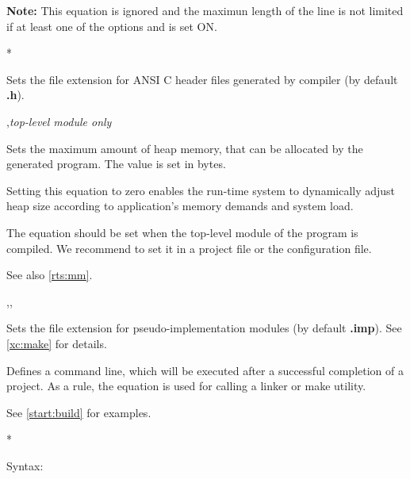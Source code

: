\begin{description}
        {\bf Note:} This equation is ignored and the maximun length of 
        the line is not limited if at least one of the options 
         and  is set ON.
\fi

\ifgenc
{}
        \MLBegin{}*\MLEnd{}

        Sets the file extension for ANSI C header
        files generated by compiler (by default {\bf .h}).
\fi

        \MLBegin{}\ModeC{},{\em top-level module only}\MLEnd{}

        Sets the maximum amount of heap memory, that can be allocated
        by the generated program. The value is set in bytes.

        Setting this equation to zero enables the run-time system
        to dynamically adjust heap size according to application's
        memory demands and system load.

        The equation should be set when the top-level module of the
        program is compiled. We recommend to set it in a
        project file or the configuration file.

        See also \ref{rts:mm}.

\ifcomment
{}
        \MLBegin{}\ModeM{},\ModeP{},\ModeG{}\MLEnd{}

        Sets the file extension for pseudo-implementation
        modules (by default {\bf .imp}).
        See \ref{xc:make} for details.
\fi

%
%


        \MLBegin{}\ModeP{}\MLEnd{}

        Defines a command line, which will be executed after a
        successful completion of a project. As a rule, the equation is
        used for calling a linker or make utility.

        See \ref{start:build} for examples.

        \MLBegin{}*\MLEnd{}

        Syntax:


\end{description}
